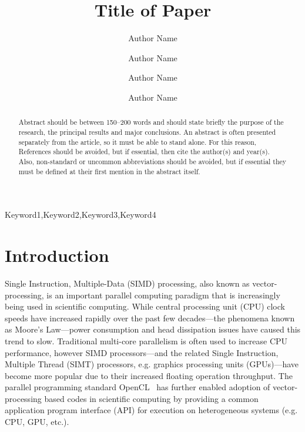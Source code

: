 \documentclass[12pt]{ussci}
\title{ Title of Paper }
\author[1]{Author Name}
\author[1]{Author Name}
\author[2]{Author Name}
\author[2,*]{Author Name}
\affil[1]{Department, Institution, Address, Country}
\affil[2]{Department, Institution, Address, Country}
\affil[*]{Corresponding author: \email{author@university.edu}}
\begin{document}
\maketitle

\begin{abstract} %
Abstract should be between 150--200 words and should state briefly the purpose
of the research, the principal results and major conclusions. An abstract is
often presented separately from the article, so it must be able to stand alone.
For this reason, References should be avoided, but if essential, then cite the
author(s) and year(s). Also, non-standard or uncommon abbreviations should be
avoided, but if essential they must be defined at their first mention in the
abstract itself.
\end{abstract}

\begin{keyword}
    Keyword1\sep Keyword2\sep Keyword3\sep Keyword4
\end{keyword}

\section{Introduction}
%

Single Instruction, Multiple-Data (SIMD) processing, also known as vector-processing, is an important parallel computing paradigm that is increasingly being used in scientific computing.
While central processing unit (CPU) clock speeds have increased rapidly over the past few decades---the phenomena known as Moore's Law---power consumption and head dissipation issues have caused this trend to slow.
Traditional multi-core parallelism is often used to increase CPU performance, however SIMD processors---and the related Single Instruction, Multiple Thread (SIMT) processors, e.g. graphics processing units (GPUs)---have become more popular due to their increased floating operation throughput.
The parallel programming standard OpenCL~\cite{stone2010opencl} has further enabled adoption of vector-processing based codes in scientific computing by providing a common application program interface (API) for execution on heterogeneous systems (e.g. CPU, GPU, etc.).
\end{document}
